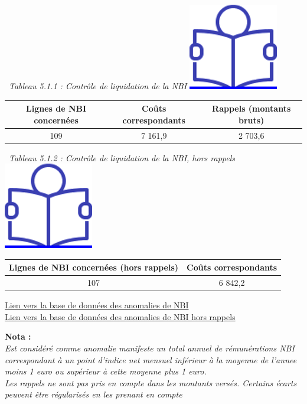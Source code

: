 ~\emph{Tableau 5.1.1 : Contrôle de liquidation de la NBI}
\href{../Docs/Notices/fiche_NBI_liq.odt}{\includegraphics{icones/Notice.png}}

\begin{longtable}[]{@{}ccc@{}}
\toprule
Lignes de NBI concernées & Coûts correspondants & Rappels (montants
bruts)\tabularnewline
\midrule
\endhead
109 & 7 161,9 & 2 703,6\tabularnewline
\bottomrule
\end{longtable}

~\emph{Tableau 5.1.2 : Contrôle de liquidation de la NBI, hors rappels}
~
\href{../Docs/Notices/fiche_NBI_liq.odt}{\includegraphics{icones/Notice.png}}

\begin{longtable}[]{@{}cc@{}}
\toprule
Lignes de NBI concernées (hors rappels) & Coûts
correspondants\tabularnewline
\midrule
\endhead
107 & 6 842,2\tabularnewline
\bottomrule
\end{longtable}

\href{../Bases/Fiabilite/lignes.nbi.anormales.csv}{Lien vers la base de
données des anomalies de NBI}\\
\href{../Bases/Fiabilite/lignes.nbi.anormales.hors.rappels.csv}{Lien vers
la base de données des anomalies de NBI hors rappels}

\textbf{Nota :}\\
\emph{Est considéré comme anomalie manifeste un total annuel de
rémunérations NBI correspondant à un point d'indice net mensuel
inférieur à la moyenne de l'annee moins 1 euro ou supérieur à cette
moyenne plus 1 euro.}\\
\emph{Les rappels ne sont pas pris en compte dans les montants versés.
Certains écarts peuvent être régularisés en les prenant en compte}

